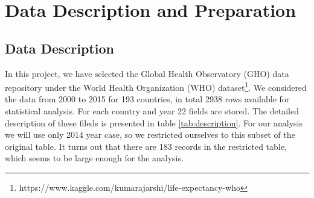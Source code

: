 \section{Data Description and Preparation}
\label{sec:data-preparation}

\subsection{Data Description}
\label{sec:data-description}

In this project, we have selected the Global Health Observatory (GHO) data repository under the World Health Organization (WHO) dataset\footnote{https://www.kaggle.com/kumarajarshi/life-expectancy-who}. We considered the data from 2000 to 2015 for 193 countries, in total 2938 rows available for statistical analysis. For each country and year 22 fields are stored. The detailed description of these fileds is presented in table \ref{tab:description}. For our analysis we will use only 2014 year case, so we restricted ourselves to this subset of the original table. It turns out that there are 183 records in the restricted table, which seems to be large enough for the analysis.

